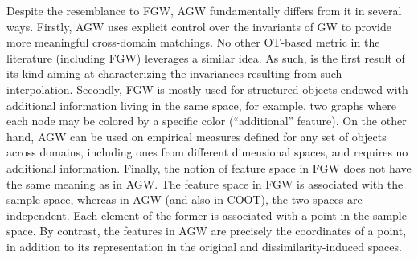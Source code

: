 Despite the resemblance to FGW, AGW fundamentally differs from it in several ways.
Firstly, AGW uses explicit control over the invariants of GW to provide more meaningful
cross-domain matchings. No other OT-based metric in the literature (including FGW)
leverages a similar idea. As such,  is the first result of its kind
aiming at characterizing the invariances resulting from such interpolation. Secondly,
FGW is mostly used for structured objects endowed with additional information living
in the same space, for example, two graphs where each node may be colored by
a specific color (``additional'' feature). On the other hand, AGW can be used on
empirical measures defined for any set of objects across domains, including ones
from different dimensional spaces, and requires no additional information. Finally,
the notion of feature space in FGW does not have the same meaning as in AGW.
The feature space in FGW is associated with the sample space, whereas in AGW (and also in COOT),
the two spaces are independent. Each element of the former is
associated with a point in the sample space. By contrast, the features in AGW are
precisely the coordinates of a point, in addition to its representation in the
original and dissimilarity-induced spaces.


